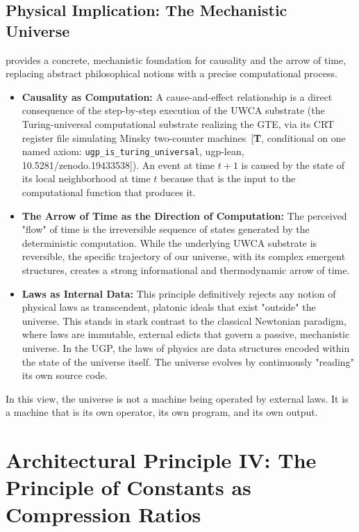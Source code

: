 \documentclass[12pt]{article}
\begin{document}
\subsection{Physical Implication: The Mechanistic Universe}
 provides a concrete, mechanistic foundation for causality and the arrow of time, replacing abstract philosophical notions with a precise computational process.
\begin{itemize}[itemsep=0.5em]
    \item \textbf{Causality as Computation:} A cause-and-effect relationship is a direct consequence of the step-by-step execution of the UWCA substrate (the Turing-universal computational substrate realizing the GTE, via its CRT register file simulating Minsky two-counter machines~[\textbf{T}, conditional on one named axiom: \texttt{ugp\_is\_turing\_universal}, ugp-lean, 10.5281/zenodo.19433538]). An event at time $t+1$ is caused by the state of its local neighborhood at time $t$ because that is the input to the computational function that produces it.
    \item \textbf{The Arrow of Time as the Direction of Computation:} The perceived "flow" of time is the irreversible sequence of states generated by the deterministic computation. While the underlying UWCA substrate is reversible, the specific trajectory of our universe, with its complex emergent structures, creates a strong informational and thermodynamic arrow of time.
    \item \textbf{Laws as Internal Data:} This principle definitively rejects any notion of physical laws as transcendent, platonic ideals that exist "outside" the universe. This stands in stark contrast to the classical Newtonian paradigm, where laws are immutable, external edicts that govern a passive, mechanistic universe. In the UGP, the laws of physics are data structures encoded within the state of the universe itself. The universe evolves by continuously "reading" its own source code.
\end{itemize}
In this view, the universe is not a machine being operated by external laws. It is a machine that is its own operator, its own program, and its own output.

\section{Architectural Principle IV: The Principle of Constants as Compression Ratios}
\label{sec:constants_as_ratios}
\end{document}
